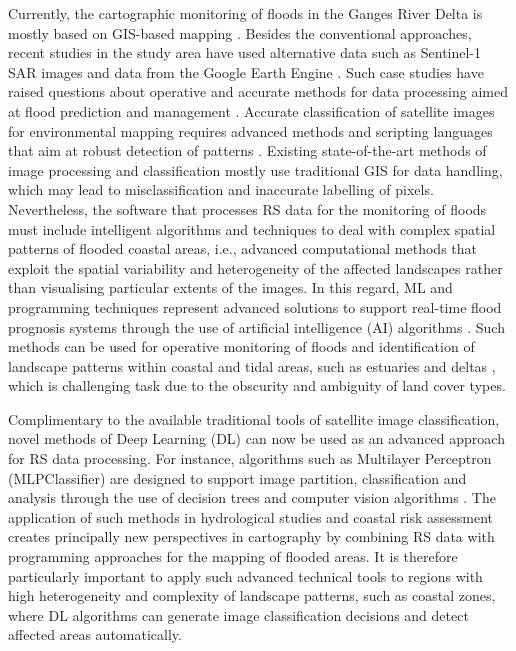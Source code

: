 \documentclass[water,article,accept,pdftex,oneauhor]{Definitions/mdpi}
\begin{document}
Currently, the cartographic monitoring of floods in the Ganges River Delta {is mostly based on} GIS-based mapping \cite{Sanyal2023,ISLAM2023167,RANA2023}. Besides the conventional approaches, recent studies in the study area have used alternative {data} such as Sentinel-1 SAR images and data from the Google Earth Engine \cite{ChakmaAkter,SINGHA2020278}%
. {Such case studies} have raised questions about operative and accurate methods for data processing aimed at flood prediction and management%
. Accurate classification of satellite images for environmental mapping requires advanced methods and scripting languages that aim at robust detection of patterns \cite{YANG2020100413,Lemenkova202322,BEVERIDGE2020104843,SADIQ2023111233,Lemenkova202227}. Existing state-of-the-art methods of image processing and classification mostly use traditional GIS for data handling, which may lead to misclassification and inaccurate labelling of pixels. {Nevertheless, the software that processes RS data for the monitoring of floods must include intelligent algorithms and techniques to deal with complex spatial patterns of flooded coastal areas, i.e., advanced computational methods that exploit the spatial variability and heterogeneity of the affected landscapes rather than visualising particular extents of the images.} {In this regard, ML and programming} techniques {represent advanced solutions} to support real-time flood prognosis systems through the use of artificial intelligence{ (AI) algorithms%
} \cite{ZHAO2021126777}. {Such methods can be used for operative monitoring of floods and }identification of landscape patterns within coastal and tidal areas, such as estuaries and deltas%
, {which }is challenging {task }due to the obscurity and ambiguity of land cover types. 

{Complimentary to} the available traditional tools of satellite image{ }classification, novel methods of Deep Learning (DL) can now be used as {an} advanced approach {for} RS {data processing}. For instance, algorithms such as Multilayer Perceptron (MLPClassifier) are designed to support image partition, classification and analysis through the use of decision trees and computer vision algorithms %
\cite{6493388,6422192,7507955}. The application of such methods in hydrological studies and coastal risk assessment creates principally new perspectives in cartography by combining RS {data }with programming approaches for the mapping of flooded areas. It is therefore particularly important to apply such advanced technical tools to regions with high heterogeneity and complexity of landscape patterns, such as coastal zones, where DL algorithms can generate image classification decisions and detect affected areas {automatically}. 
\end{document}
